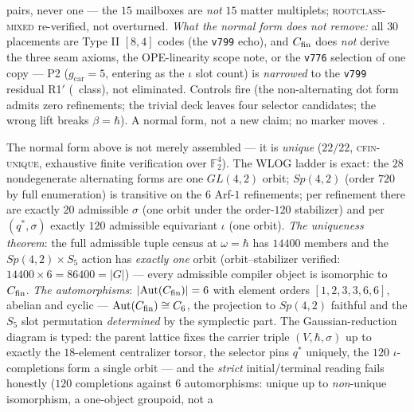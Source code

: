 \documentclass[11pt,a4paper]{article}
\newcommand{\gcar}{g_{\mathrm{car}}}
\theoremstyle{definition}
\begin{document}
\begin{keybox}[The finite compiler normal form $C_{\rm fin}=(V,\hbar,q^{*},\sigma,\iota)$ (2026-08-07) --- one object, the kill built in \mE\ (\veri{v845\_cfin\_normal\_form.py})]
pairs, never one --- the $15$ mailboxes are \emph{not} $15$
matter multiplets; \textsc{rootclass-mixed} re-verified, not
overturned.  \emph{What the normal form does not remove:} all
$30$ placements are Type II $[8,4]$ codes (the \texttt{v799}
echo), and $C_{\rm fin}$ does \emph{not} derive the three seam
axioms, the OPE-linearity scope note, or the \texttt{v776}
selection of one copy --- P2 ($\gcar = 5$, entering as the
$\iota$ slot count) is \emph{narrowed} to the \texttt{v799}
residual R1$'$ (\mC\ class), not eliminated.  Controls fire (the
non-alternating dot form admits zero refinements; the trivial
deck leaves four selector candidates; the wrong lift breaks
$\beta = \hbar$).  A normal form, not a new claim; no marker
moves \mE.
\end{keybox}

\begin{keybox}
The normal form above is not merely assembled --- it is
\emph{unique} ($22/22$, \textsc{cfin-unique}, exhaustive finite
verification over $\mathbb{F}_2^4$).  The WLOG ladder is exact: the $28$
nondegenerate alternating forms are one $GL(4,2)$ orbit;
$Sp(4,2)$ (order $720$ by full enumeration) is transitive on the
$6$ Arf-$1$ refinements; per refinement there are exactly $20$
admissible $\sigma$ (one orbit under the order-$120$ stabilizer)
and per $(q^{*},\sigma)$ exactly $120$ admissible equivariant
$\iota$ (one orbit).  \emph{The uniqueness theorem}: the full
admissible tuple census at $\omega = \hbar$ has $14400$ members
and the $Sp(4,2)\times S_5$ action has \emph{exactly one} orbit
(orbit--stabilizer verified: $14400 \times 6 = 86400 =
\lvert G\rvert$) --- every admissible compiler object is
isomorphic to $C_{\rm fin}$.  \emph{The automorphisms}:
$\lvert\mathrm{Aut}(C_{\rm fin})\rvert = 6$ with element orders
$[1,2,3,3,6,6]$, abelian and cyclic --- $\mathrm{Aut}(C_{\rm
fin}) \cong C_6$, the projection to $Sp(4,2)$ faithful and the
$S_5$ slot permutation \emph{determined} by the symplectic part.
The Gaussian-reduction diagram is typed: the parent lattice fixes
the carrier triple $(V, \hbar, \sigma)$ up to exactly the
$18$-element centralizer torsor, the selector pins $q^{*}$
uniquely, the $120$ $\iota$-completions form a single orbit ---
and the \emph{strict} initial/terminal reading fails honestly
($120$ completions against $6$ automorphisms: unique up to
\emph{non}-unique isomorphism, a one-object groupoid, not a

\end{keybox}
\end{document}
